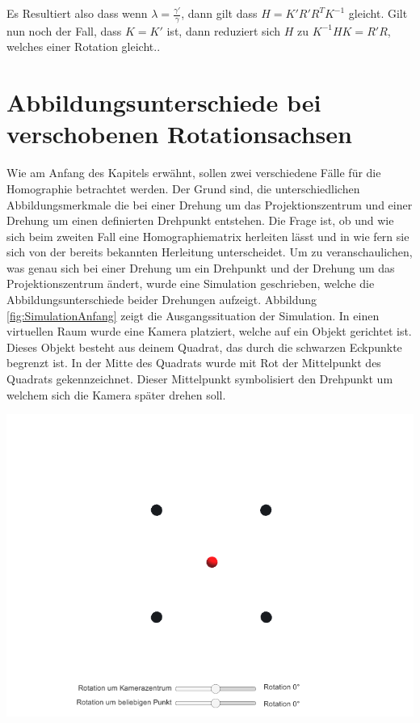 Es Resultiert also dass wenn $\lambda = \frac{\gamma'}{\gamma}$, dann gilt dass $H = K'R'R^TK^{-1}$ gleicht. Gilt nun noch der Fall, dass $K = K'$ ist, dann reduziert sich $H$ zu $K^{-1}HK = R'R$, welches einer Rotation gleicht.\cite{Elements}. 




\section{Abbildungsunterschiede bei verschobenen Rotationsachsen}

Wie am Anfang des Kapitels erwähnt, sollen zwei verschiedene Fälle für die Homographie betrachtet werden. Der Grund sind, die unterschiedlichen Abbildungsmerkmale die bei einer Drehung um das Projektionszentrum und einer Drehung um einen definierten Drehpunkt entstehen. Die Frage ist, ob und wie sich beim zweiten Fall eine Homographiematrix herleiten lässt und in wie fern sie sich von der bereits bekannten Herleitung unterscheidet. Um zu veranschaulichen, was genau sich bei einer Drehung um ein Drehpunkt und der Drehung um das Projektionszentrum ändert, wurde eine Simulation geschrieben, welche die Abbildungsunterschiede beider Drehungen aufzeigt. Abbildung \ref{fig:SimulationAnfang} zeigt die Ausgangssituation der Simulation. In einen virtuellen Raum wurde eine Kamera platziert, welche auf ein Objekt gerichtet ist. Dieses Objekt besteht aus deinem Quadrat, das durch die schwarzen Eckpunkte begrenzt ist. In der Mitte des Quadrats wurde mit Rot der Mittelpunkt des Quadrats gekennzeichnet. Dieser Mittelpunkt symbolisiert den Drehpunkt um welchem sich die Kamera später drehen soll. 

\begin{minipage}{\linewidth}
	\centering
	\includegraphics[width=.8\linewidth]{images/Ausgangslage.png}
	\label{fig:SimulationAnfang}
\end{minipage}\\

